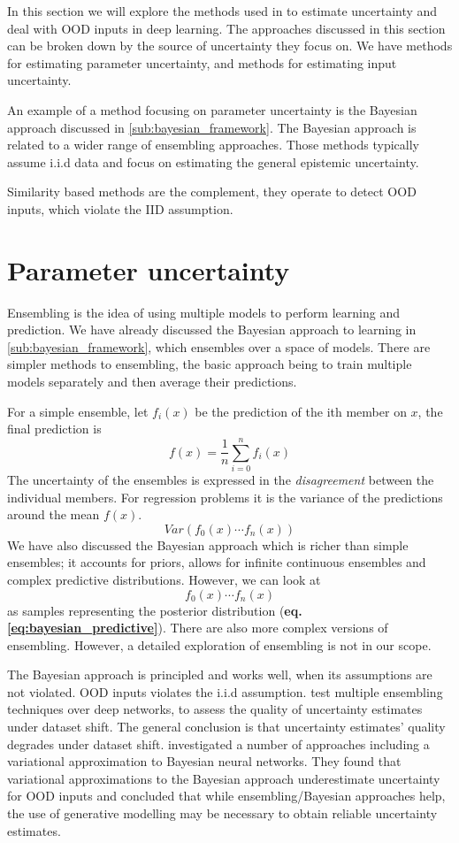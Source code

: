 \documentclass[../main.tex]{subfiles}
\begin{document}
In this section we will explore the methods used in to estimate uncertainty and deal with OOD inputs in deep learning. The approaches discussed in this section can be broken down by the source of uncertainty they focus on. We have methods for estimating parameter uncertainty, and methods for estimating input uncertainty. 

An example of a method focusing on parameter uncertainty is the Bayesian approach discussed in  \ref{sub:bayesian_framework}. The Bayesian approach is related to a wider range of ensembling approaches. Those methods typically assume i.i.d data and focus on estimating the general epistemic uncertainty. 


Similarity based methods are the complement, they operate to detect OOD inputs, which violate the IID assumption.  

\section{Parameter uncertainty}

Ensembling is the idea of using multiple models to perform learning and prediction. We have already discussed the Bayesian approach to learning in \cref{sub:bayesian_framework}, which ensembles over a space of models. There are simpler methods to ensembling, the basic approach being to train multiple models separately and then average their predictions.

For a simple ensemble, let $f_i(x)$ be the prediction of the ith member on $x$, the final prediction is 
$$f(x) = \frac{1}{n} \sum_{i=0}^n f_i(x)$$ 
The uncertainty of the ensembles is expressed in the \emph{disagreement} between the individual members. For regression problems it is the variance of the predictions around the mean $f(x)$. 
$$Var(f_0(x) \cdots f_n(x))$$
We have also discussed the Bayesian approach which is richer than simple ensembles; it accounts for priors, allows for infinite continuous ensembles and complex predictive distributions. However, we can look at $${f_0(x) \cdots f_n(x)}$$ as samples representing the posterior distribution (\textbf{eq.\ref{eq:bayesian_predictive}}).
There are also more complex versions of ensembling. However, a detailed exploration of ensembling is not in our scope. 

The Bayesian approach is principled and works well, when its assumptions are not violated. OOD inputs violates the i.i.d assumption. \citet{ovadia2019can} test multiple ensembling techniques over deep networks, to assess the quality of uncertainty estimates under dataset shift. The general conclusion is that uncertainty estimates' quality degrades under dataset shift. \citet{Mundt2019open} investigated a number of approaches including a variational approximation to Bayesian neural networks. They found that variational approximations to the Bayesian approach underestimate uncertainty for OOD inputs and concluded that while ensembling/Bayesian approaches help, the use of generative modelling may be necessary to obtain reliable uncertainty estimates.
\end{document}
